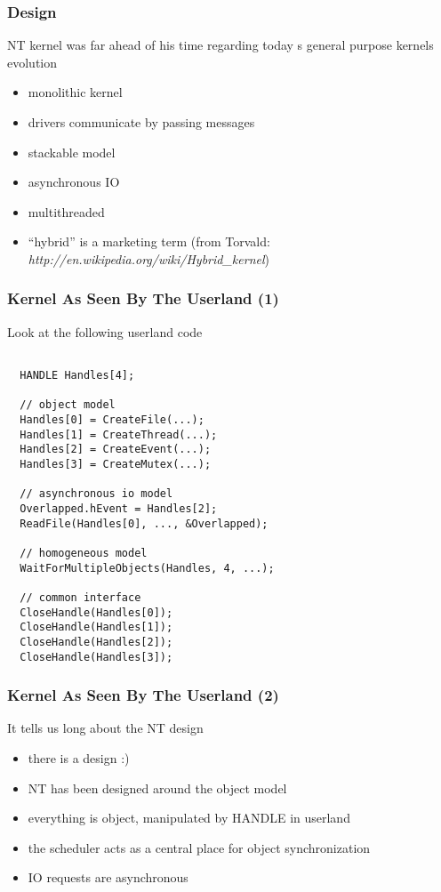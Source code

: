 \begin{frame}
  \frametitle{Design}

  NT kernel was far ahead of his time regarding today s general purpose kernels evolution

  \begin{itemize}
    \item
      monolithic kernel
    \item
      drivers communicate by passing messages
    \item
      stackable model
    \item
      asynchronous IO
    \item
      multithreaded
    \item
      ``hybrid'' is a marketing term (from Torvald: \textit{http://en.wikipedia.org/wiki/Hybrid\_kernel})
  \end{itemize}

\end{frame}


\begin{frame}[containsverbatim]
  \frametitle{Kernel As Seen By The Userland (1)}
   
  Look at the following userland code

  \begin{verbatim}

  HANDLE Handles[4];

  // object model
  Handles[0] = CreateFile(...);
  Handles[1] = CreateThread(...);
  Handles[2] = CreateEvent(...);
  Handles[3] = CreateMutex(...);

  // asynchronous io model
  Overlapped.hEvent = Handles[2];
  ReadFile(Handles[0], ..., &Overlapped);

  // homogeneous model
  WaitForMultipleObjects(Handles, 4, ...);

  // common interface
  CloseHandle(Handles[0]);
  CloseHandle(Handles[1]);
  CloseHandle(Handles[2]);
  CloseHandle(Handles[3]);

  \end{verbatim}
  
\end{frame}

\begin{frame}
  \frametitle{Kernel As Seen By The Userland (2)}

 It tells us long about the NT design

 \begin{itemize}
   \item
     there is a design :)
   \item
     NT has been designed around the object model
   \item
     everything is object, manipulated by HANDLE in userland
   \item
     the scheduler acts as a central place for object synchronization
   \item
     IO requests are asynchronous
 \end{itemize}

\end{frame}


